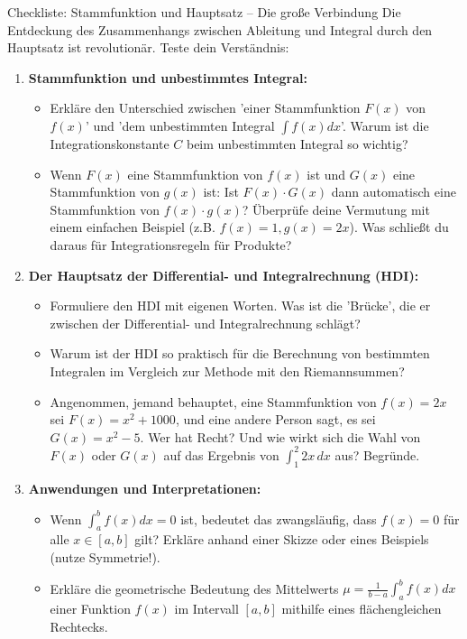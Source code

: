 \begin{aufgabenumgebung}{Checkliste: Stammfunktion und Hauptsatz – Die große Verbindung}
Die Entdeckung des Zusammenhangs zwischen Ableitung und Integral durch den Hauptsatz ist revolutionär. Teste dein Verständnis:

\begin{enumerate}[label=(\alph*)]
    \item \textbf{Stammfunktion und unbestimmtes Integral:}
    \begin{itemize}
        \item Erkläre den Unterschied zwischen 'einer Stammfunktion $F(x)$ von $f(x)$' und 'dem unbestimmten Integral $\int f(x)dx$'. Warum ist die Integrationskonstante $C$ beim unbestimmten Integral so wichtig?
        \item Wenn $F(x)$ eine Stammfunktion von $f(x)$ ist und $G(x)$ eine Stammfunktion von $g(x)$ ist: Ist $F(x) \cdot G(x)$ dann automatisch eine Stammfunktion von $f(x) \cdot g(x)$? Überprüfe deine Vermutung mit einem einfachen Beispiel (z.B. $f(x)=1, g(x)=2x$). Was schließt du daraus für Integrationsregeln für Produkte?
    \end{itemize}
    \item \textbf{Der Hauptsatz der Differential- und Integralrechnung (HDI):}
    \begin{itemize}
        \item Formuliere den HDI mit eigenen Worten. Was ist die 'Brücke', die er zwischen der Differential- und Integralrechnung schlägt?
        \item Warum ist der HDI so praktisch für die Berechnung von bestimmten Integralen im Vergleich zur Methode mit den Riemannsummen?
        \item Angenommen, jemand behauptet, eine Stammfunktion von $f(x)=2x$ sei $F(x)=x^2+1000$, und eine andere Person sagt, es sei $G(x)=x^2-5$. Wer hat Recht? Und wie wirkt sich die Wahl von $F(x)$ oder $G(x)$ auf das Ergebnis von $\int_1^2 2x \,dx$ aus? Begründe.
    \end{itemize}
    \item \textbf{Anwendungen und Interpretationen:}
    \begin{itemize}
        \item Wenn $\int_a^b f(x)dx = 0$ ist, bedeutet das zwangsläufig, dass $f(x)=0$ für alle $x \in [a,b]$ gilt? Erkläre anhand einer Skizze oder eines Beispiels (nutze Symmetrie!).
        \item Erkläre die geometrische Bedeutung des Mittelwerts $\mu = \frac{1}{b-a} \int_a^b f(x)dx$ einer Funktion $f(x)$ im Intervall $[a,b]$ mithilfe eines flächengleichen Rechtecks.
    \end{itemize}
\end{enumerate}
\end{aufgabenumgebung}




